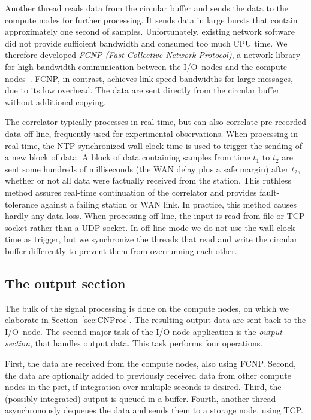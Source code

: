 \documentclass{sig-alternate}
\begin{document}
Another thread reads data from the circular buffer and sends the data to
the compute nodes for further processing.
It sends data in large bursts that contain approximately one second of samples.
Unfortunately, existing network software did not provide sufficient bandwidth
and consumed too much CPU time.
We therefore developed \emph{FCNP (Fast Collective-Network Protocol)}, a 
network library for high-bandwidth communication between the I/O~nodes and the
compute nodes~\cite{Romein:09a}.
FCNP, in contrast, achieves link-speed bandwidths for large messages, due to
its low overhead.
The data are sent directly from the circular buffer without additional copying.

The correlator typically processes in real time, but can also correlate
pre-recorded data off-line, frequently used for experimental observations.
When processing in real time, the NTP-synchronized wall-clock time
is used to trigger the sending of a new block of data.
A block of data containing samples from time $t_1$ to $t_2$ are sent some 
hundreds of milliseconds (the WAN delay plus a safe margin) after $t_2$,
whether or not all data were factually received from the station.
This ruthless method assures real-time continuation of the correlator and
provides fault-tolerance against a failing station or WAN link.
In practice, this method causes hardly any data loss.
When processing off-line, the input is read from file or TCP socket rather
than a UDP socket.
In off-line mode we do not use the wall-clock time as
trigger, but we synchronize the threads that read and write the circular
buffer differently to prevent them from overrunning each other.


\subsection{The output section}

The bulk of the signal processing is done on the compute nodes, on which we
elaborate in Section~\ref{sec:CNProc}.
The resulting output data are sent back to the I/O~node.
The second major task of the I/O-node application is the \emph{output section},
that handles output data.
This task performs four operations.

First, the data are received from the compute nodes, also using FCNP.
Second, the data are optionally added to previously received data from other
compute nodes in the pset, if integration over multiple seconds is desired.
Third, the (possibly integrated) output is queued in a buffer.
Fourth, another thread asynchronously dequeues the data and sends them to
a storage node, using TCP.
\end{document}
